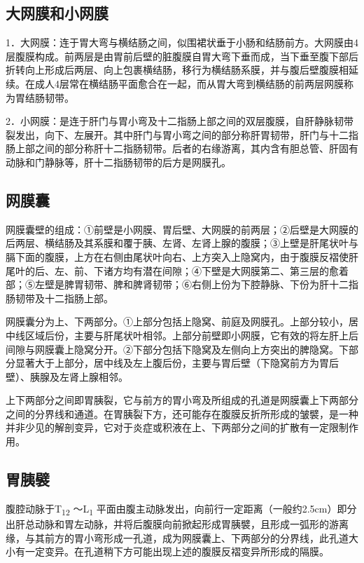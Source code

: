 \subsection{大网膜和小网膜}

1．大网膜：连于胃大弯与横结肠之间，似围裙状垂于小肠和结肠前方。大网膜由4层腹膜构成。前两层是由胃前后壁的脏腹膜自胃大弯下垂而成，当下垂至腹下部后折转向上形成后两层、向上包裹横结肠，移行为横结肠系膜，并与腹后壁腹膜相延续。在成人4层常在横结肠平面愈合在一起，而从胃大弯到横结肠的前两层网膜称为胃结肠韧带。

2．小网膜：是连于肝门与胃小弯及十二指肠上部之间的双层腹膜，自肝静脉韧带裂发出，向下、左展开。其中肝门与胃小弯之间的部分称肝胃韧带，肝门与十二指肠上部之间的部分称肝十二指肠韧带。后者的右缘游离，其内含有胆总管、肝固有动脉和门静脉等，肝十二指肠韧带的后方是网膜孔。

\subsection{网膜囊}

网膜囊壁的组成：①前壁是小网膜、胃后壁、大网膜的前两层；②后壁是大网膜的后两层、横结肠及其系膜和覆于胰、左肾、左肾上腺的腹膜；③上壁是肝尾状叶与膈下面的腹膜，上方在右侧由尾状叶向右、上方突入上隐窝内，由于腹膜反褶使肝尾叶的后、左、前、下诸方均有潜在间隙；④下壁是大网膜第二、第三层的愈着部；⑤左壁是脾胃韧带、脾和脾肾韧带；⑥右侧上份为下腔静脉、下份为肝十二指肠韧带及十二指肠上部。

网膜囊分为上、下两部分。①上部分包括上隐窝、前庭及网膜孔。上部分较小，居中线区域后份，主要与肝尾状叶相邻。上部分前壁即小网膜，它有效的将左肝上后间隙与网膜囊上隐窝分开。②下部分包括下隐窝及左侧向上方突出的脾隐窝。下部分显著大于上部分，居中线及左上腹后份，主要与胃后壁（下隐窝前方为胃后壁）、胰腺及左肾上腺相邻。

上下两部分之间即胃胰裂，它与前方的胃小弯及所组成的孔道是网膜囊上下两部分之间的分界线和通道。在胃胰裂下方，还可能存在腹膜反折所形成的皱襞，是一种并非少见的解剖变异，它对于炎症或积液在上、下两部分之间的扩散有一定限制作用。

\subsection{胃胰襞}

腹腔动脉于T\textsubscript{12} ～L\textsubscript{1}
平面由腹主动脉发出，向前行一定距离（一般约2.5cm）即分出肝总动脉和胃左动脉，并将后腹膜向前掀起形成胃胰襞，且形成一弧形的游离缘，与其前方的胃小弯形成一孔道，成为网膜囊上、下两部分的分界线，此孔道大小有一定变异。在孔道稍下方可能出现上述的腹膜反褶变异所形成的隔膜。

